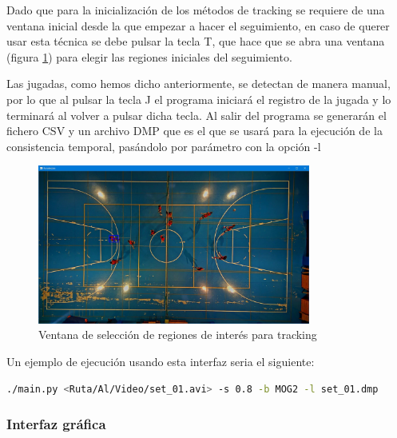Dado que para la inicialización de los métodos de tracking se requiere de una ventana inicial desde la que empezar a hacer el seguimiento, en caso de querer usar esta técnica se debe pulsar la tecla T, que hace que se abra una ventana (figura \ref{fig:iniciatracking}) para elegir las regiones iniciales del seguimiento.

Las jugadas, como hemos dicho anteriormente, se detectan de manera manual, por lo que al pulsar la tecla J el programa iniciará el registro de la jugada y lo terminará al volver a pulsar dicha tecla. Al salir del programa se generarán el fichero CSV y un archivo DMP que es el que se usará para la ejecución de la consistencia temporal, pasándolo por parámetro con la opción -l

\begin{figure}
    \centering
    \includegraphics[width=0.8\textwidth]{images/ejemplotracking}
    \caption{Ventana de selección de regiones de interés para tracking}
    \label{fig:iniciatracking}
\end{figure}

Un ejemplo de ejecución usando esta interfaz seria el siguiente:
\begin{lstlisting}[language=bash]
  ./main.py <Ruta/Al/Video/set_01.avi> -s 0.8 -b MOG2 -l set_01.dmp
\end{lstlisting}


\subsubsection*{Interfaz gráfica}


